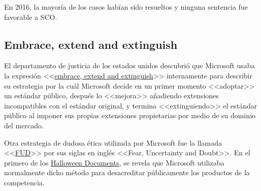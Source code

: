 En 2016, la mayoría de los casos habían sido resueltos y ninguna sentencia fue favorable a SCO.\cite{wiki_2019:sco_linux}

\subsection{Embrace, extend and extinguish}
El departamento de justicia de los estados unidos descubrió que Microsoft usaba la expresión <<\href{https://en.wikipedia.org/wiki/Embrace,_extend,_and_extinguish}{embrace, extend and extinguish}>> internamente para describir su estrategia por la cuál Microsoft decide en un primer momento <<adoptar>> un estándar público, después lo <<mejora>> añadiendo extensiones incompatibles con el estándar original, y termina <<extinguiendo>> el estándar público al imponer sus propias extensiones propietarias por medio de su dominio del mercado.\cite{wiki_2020:embrace_extend_extinguish}

\label{par:FUD}
Otra estrategia de dudosa ética utilizada por Microsoft fue la llamada <<\href{https://en.wikipedia.org/wiki/Fear,_uncertainty,_and_doubt}{FUD}>> por sus siglas en inglés <<Fear, Uncertainty and Doubt>>\cite{wiki_2020:FUD}. En el primero de los \href{https://en.wikipedia.org/wiki/Halloween_documents}{Halloween Documents}\cite{wiki_2020:halloween_documents}, se revela que Microsoft utilizaba normalmente dicho método para desacreditar públicamente los productos de la competencia.